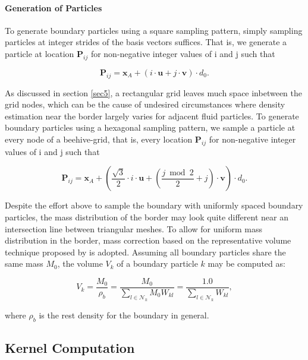 \documentclass[
	11pt, 
	DIV10,
	ngerman,
	a4paper, 
	oneside, 
	headings=normal, 
	captions=tableheading,
	final, 
	numbers=noenddot
]{scrartcl}
\begin{document}
\paragraph{Generation of Particles} To generate boundary particles using a square sampling pattern, simply sampling particles at integer strides of the basis vectors suffices. That is, we generate a particle at location $ \boldsymbol{P}_{ij} $ for non-negative integer values of i and j such that

\begin{equation}
	\label{eq8}
	\boldsymbol{P}_{ij} = \boldsymbol{x}_{A} + \left(i \cdot \boldsymbol{u} + j \cdot \boldsymbol{v}\right) \cdot d_{0}.
\end{equation}

As discussed in section \ref{sec5}, a rectangular grid leaves much space inbetween the grid nodes, which can be the cause of undesired circumstances where density estimation near the border largely varies for adjacent fluid particles. To generate boundary particles using a hexagonal sampling pattern, we sample a particle at every node of a beehive-grid, that is, every location $ \boldsymbol{P}_{ij} $ for non-negative integer values of i and j such that

\begin{equation}
	\label{eq9}
	\boldsymbol{P}_{ij} = \boldsymbol{x}_{A} + \left(\frac{\sqrt{3}}{2} \cdot i \cdot \boldsymbol{u} + \left( \frac{j \bmod 2}{2} + j\right) \cdot \boldsymbol{v}\right) \cdot d_{0}.
\end{equation}

Despite the effort above to sample the boundary with uniformly spaced boundary particles, the mass distribution of the border may look quite different near an intersection line between triangular meshes. To allow for uniform mass distribution in the border, mass correction based on the representative volume technique proposed by \cite{akinci2012versatile} is adopted. Assuming all boundary particles share the same mass $ M_{0} $, the volume $ V_{k} $ of a boundary particle $ k $ may be computed as:

\begin{equation}
	\label{eq10}
    V_{k} = \frac{M_{0}}{\rho_{b}} = \frac{M_{0}}{\sum_{l \in \mathcal{N}_{k}} M_{0} W_{kl}} = \frac{1.0}{\sum_{l \in \mathcal{N}_{k}} W_{kl}},
\end{equation}

where $ \rho_{b} $ is the rest density for the boundary in general.

\subsection{Kernel Computation}
\end{document}
